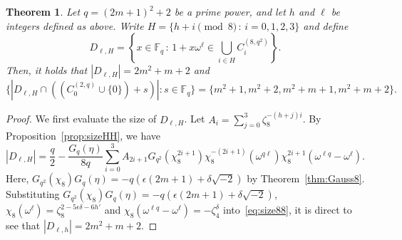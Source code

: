\documentclass[10pt]{amsart}
\newtheorem{theo}{Theorem}[section]
\theoremstyle{definition}
\newcommand*\F{{\mathbb F}}
\begin{document}
\begin{theo}\label{thm:twoint}
Let $q=(2m+1)^2+2$ be a prime power, and let $h$ and $\ell$ be integers defined as above. Write $H=\{h+i\pmod{8}\,:\,i=0,1,2,3\}$ and define
\[
D_{\ell,H}=\left\{x\in \F_q\,:\, 1+x\omega^\ell\in \bigcup_{i\in H}C_{i}^{(8,q^2)}\right\}.
\]
Then, it holds that $|D_{\ell,H}|=2m^2+m+2$ and
\[
\{|D_{\ell,H}\cap ((C_0^{(2,q)}\cup \{0\})+s)|:s\in \F_q\}= \{m^2+1,m^2+2,m^2+m+1,m^2+m+2\}.
\]
\end{theo}

\begin{proof}
We first evaluate the size of $D_{\ell,H}$. Let $A_i=\sum_{j=0}^3\zeta_8^{-(h+j)i}$. By Proposition~\ref{prop:sizeHH}, we have
\begin{equation}\label{eq:size88}
|D_{\ell,H}|=\frac{q}{2}-\frac{G_q(\eta)}{8q}\sum_{i=0}^{3} A_{2i+1} G_{q^2}(\chi_8^{2i+1})\chi_8^{-(2i+1)}(\omega^{q\ell})\chi_8^{2i+1}(\omega^{\ell q}-\omega^{\ell}).
\end{equation}
Here, $G_{q^2}(\chi_8)G_q(\eta)=-q(\epsilon (2m+1)+\delta \sqrt{-2})$ by Theorem~\ref{thm:Gauss8}. Substituting $G_{q^2}(\chi_8)G_q(\eta)=-q(\epsilon (2m+1)+\delta \sqrt{-2})$, $\chi_8(\omega^\ell)=\zeta_8^{2-5\epsilon \delta-6h'}$ and $\chi_8(\omega^{\ell q}-\omega^\ell)=-\zeta_4^{\delta}$ into~\eqref{eq:size88}, it is direct to see that $|D_{\ell,h}|=2m^2+m+2$.


\end{proof}
\end{document}

